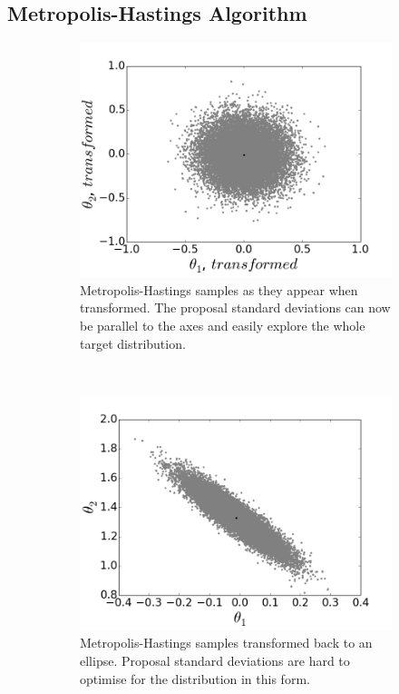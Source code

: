 \documentclass[a4paper,11pt,twoside]{article}
\begin{document}
\subsection{Metropolis-Hastings Algorithm} 
\begin{figure}[!ht]
	\centering
	\begin{subfigure}[t]{0.4\linewidth}
		\centering
		\includegraphics[width=\textwidth]{rot.png}
		\caption{Metropolis-Hastings samples as they appear when
		transformed. The proposal standard deviations can now be parallel to
		the axes and easily explore the whole target distribution.}
		\label{fig:rot}
	\end{subfigure}
	~
	\begin{subfigure}[t]{0.4\linewidth}
		\centering
		\includegraphics[width=\textwidth]{unrot.png}
		\caption{Metropolis-Hastings samples transformed back to
		an ellipse. Proposal standard deviations are hard to optimise
		for the distribution in this form. }
		\label{fig:unrot}
	\end{subfigure}
	\caption{}\label{fig:rot-unrot}
\end{figure}
\end{document}
